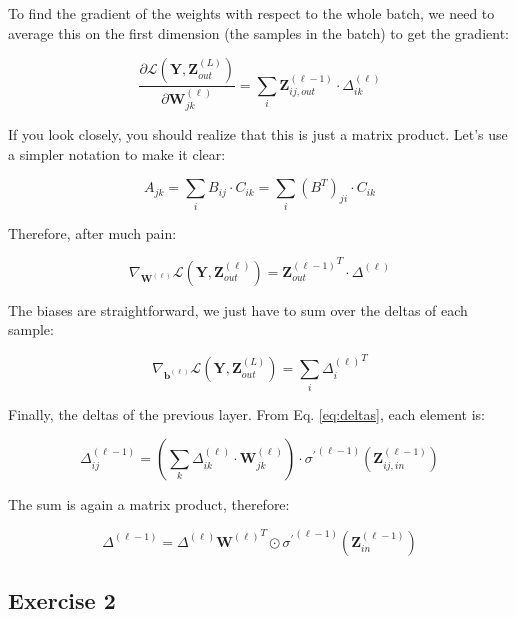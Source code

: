 \documentclass[
  a4paper,
]{article}
\begin{document}
To find the gradient of the weights with respect to the whole batch, we
need to average this on the first dimension (the samples in the batch)
to get the gradient:

\begin{equation}
\frac{\partial\mathcal{L}(\textbf{Y},\textbf{Z}^{(L)}_{out})}{\partial \textbf{W}^{(\ell)}_{jk}}
=\sum_i
\textbf{Z}^{(\ell-1)}_{ij,out}
\cdot\Delta^{(\ell)}_{ik}
\end{equation}

If you look closely, you should realize that this is just a matrix
product. Let's use a simpler notation to make it clear:

\begin{equation}
A_{jk}=\sum_i B_{ij}\cdot C_{ik}=\sum_i {\left(B^T\right)}_{ji}\cdot C_{ik}
\end{equation}

Therefore, after much pain:

\begin{equation}
\nabla_{\textbf{W}^{(\ell)}}\mathcal{L}(\textbf{Y},\textbf{Z}^{(\ell)}_{out})
={\textbf{Z}^{(\ell-1)}_{out}}^T
\cdot\Delta^{(\ell)}
\end{equation}

The biases are straightforward, we just have to sum over the deltas of
each sample:

\begin{equation}
\nabla_{\textbf{b}^{(\ell)}}\mathcal{L}(\textbf{Y},\textbf{Z}^{(L)}_{out})=\sum_i {\Delta^{(\ell)}_i}^T
\end{equation}

Finally, the deltas of the previous layer. From Eq. \ref{eq:deltas},
each element is:

\begin{equation}
\Delta^{(\ell-1)}_{ij}=\left(
  \sum_k\Delta^{(\ell)}_{ik}\cdot\textbf{W}^{(\ell)}_{jk}
\right)\cdot{\sigma^\prime}^{(\ell-1)}(\textbf{Z}^{(\ell-1)}_{ij,in})
\end{equation}

The sum is again a matrix product, therefore:

\begin{equation}
\Delta^{(\ell-1)}=\Delta^{(\ell)}{\textbf{W}^{(\ell)}}^T\odot{\sigma^\prime}^{(\ell-1)}(\textbf{Z}^{(\ell-1)}_{in})
\end{equation}

\hypertarget{exercise-2}{%
\subsection{Exercise 2}\label{exercise-2}}
\end{document}
